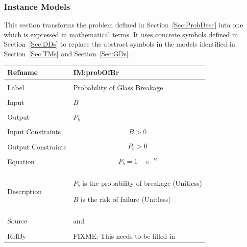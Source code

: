 \documentclass[12pt]{article}
\begin{document}
\subsubsection{Instance Models}
\label{Sec:IMs}
This section transforms the problem defined in Section~\ref{Sec:ProbDesc} into one which is expressed in mathematical terms. It uses concrete symbols defined in Section~\ref{Sec:DDs} to replace the abstract symbols in the models identified in Section~\ref{Sec:TMs} and Section~\ref{Sec:GDs}.
~\newline
\noindent \begin{minipage}{\textwidth}
\begin{tabular}{p{} p{}}
\toprule \textbf{Refname} & \textbf{IM:probOfBr}
\label{IM:probOfBr}
\\ \midrule \\
Label & Probability of Glass Breakage
\\ \midrule \\
Input & $B$
\\ \midrule \\
Output & ${P_{b}}$
\\ \midrule \\
Input Constraints & \begin{dmath}
                    B>0
                    \end{dmath}
\\ \midrule \\
Output Constraints & \begin{dmath}
                     {P_{b}}>0
                     \end{dmath}
\\ \midrule \\
Equation & \begin{dmath}
           {P_{b}}=1-e^{-B}
           \end{dmath}
\\ \midrule \\
Description & \begin{symbDescription}
              \item{${P_{b}}$ is the probability of breakage (Unitless)}
              \item{$B$ is the risk of failure (Unitless)}
              \end{symbDescription}
\\ \midrule \\
Source & \cite{astm2009} and \cite{beasonEtAl1998}
\\ \midrule \\
RefBy & FIXME: This needs to be filled in
\\ \bottomrule \end{tabular}
\end{minipage}\\
\end{document}
